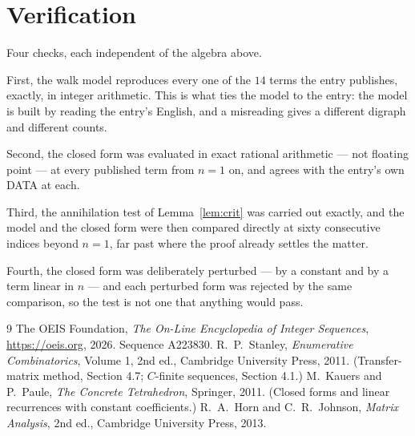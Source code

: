 \documentclass[11pt,a4paper]{article}
\theoremstyle{plain}
\theoremstyle{definition}
\begin{document}
\section{Verification}

Four checks, each independent of the algebra above.

First, the walk model reproduces every one of the $14$ terms the entry publishes,
exactly, in integer arithmetic. This is what ties the model to the entry: the model is built
by reading the entry's English, and a misreading gives a different digraph and different
counts.

Second, the closed form was evaluated in exact rational arithmetic --- not floating point ---
at every published term from $n=1$ on, and agrees with the entry's own DATA at each.

Third, the annihilation test of Lemma~\ref{lem:crit} was carried out exactly, and the model
and the closed form were then compared directly at sixty consecutive indices beyond
$n=1$, far past where the proof already settles the matter.

Fourth, the closed form was deliberately perturbed --- by a constant and by a term linear in
$n$ --- and each perturbed form was rejected by the same comparison, so the test is not one
that anything would pass.

\begin{thebibliography}{9}
 The OEIS Foundation, \emph{The On-Line Encyclopedia of Integer
Sequences}, \url{https://oeis.org}, 2026. Sequence A223830.
 R.~P.~Stanley, \emph{Enumerative Combinatorics}, Volume 1, 2nd ed.,
Cambridge University Press, 2011. (Transfer-matrix method, Section 4.7; $C$-finite sequences,
Section 4.1.)
 M.~Kauers and P.~Paule, \emph{The Concrete Tetrahedron}, Springer, 2011.
(Closed forms and linear recurrences with constant coefficients.)
 R.~A.~Horn and C.~R.~Johnson, \emph{Matrix Analysis}, 2nd ed., Cambridge
University Press, 2013.
\end{thebibliography}
\end{document}

